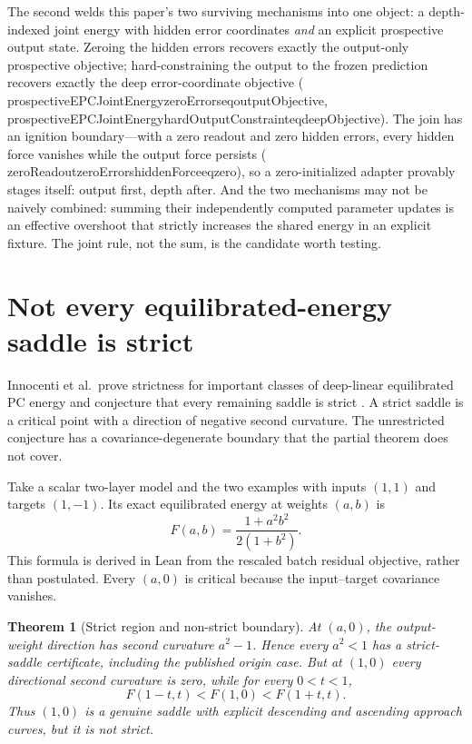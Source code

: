 \documentclass[11pt]{article}
\newtheorem{theorem}{Theorem}[section]
\newcommand{\leanname}[1]{{\scriptsize\ttfamily
  \def\_{\textunderscore\allowbreak}#1}}
\begin{document}
The second welds this paper's two surviving mechanisms into one object: a depth-indexed
joint energy with hidden error coordinates \emph{and} an explicit prospective output
state. Zeroing the hidden errors recovers exactly the output-only prospective objective;
hard-constraining the output to the frozen prediction recovers exactly the deep
error-coordinate objective
(\leanname{prospectiveEPCJointEnergy\_zeroErrors\_eq\_outputObjective},
\leanname{prospectiveEPCJointEnergy\_hardOutputConstraint\_eq\_deepObjective}). The join
has an ignition boundary---with a zero readout and zero hidden errors, every hidden force
vanishes while the output force persists
(\leanname{zeroReadout\_zeroErrors\_hiddenForce\_eq\_zero}), so a zero-initialized adapter
provably stages itself: output first, depth after. And the two mechanisms may not be
naively combined: summing their independently computed parameter updates is an effective
overshoot that strictly increases the shared energy in an explicit fixture. The joint
rule, not the sum, is the candidate worth testing.

\section{Not every equilibrated-energy saddle is strict}
\label{sec:saddles}

Innocenti et al.\ prove strictness for important classes of deep-linear equilibrated PC
energy and conjecture that every remaining saddle is strict \cite{innocenti2025}. A
strict saddle is a critical point with a direction of negative second curvature. The
unrestricted conjecture has a covariance-degenerate boundary that the partial theorem
does not cover.

Take a scalar two-layer model and the two examples with inputs $(1,1)$ and targets
$(1,-1)$. Its exact equilibrated energy at weights $(a,b)$ is
\[
F(a,b)=\frac{1+a^2b^2}{2(1+b^2)}.
\]
This formula is derived in Lean from the rescaled batch residual objective, rather than
postulated. Every $(a,0)$ is critical because the input--target covariance vanishes.

\begin{theorem}[Strict region and non-strict boundary]\label{thm:saddles}
At $(a,0)$, the output-weight direction has second curvature $a^2-1$. Hence every
$a^2<1$ has a strict-saddle certificate, including the published origin case. But at
$(1,0)$ every directional second curvature is zero, while for every $0<t<1$,
\[
F(1-t,t)<F(1,0)<F(1+t,t).
\]
Thus $(1,0)$ is a genuine saddle with explicit descending and ascending approach curves,
but it is not strict.
\end{theorem}
\end{document}
